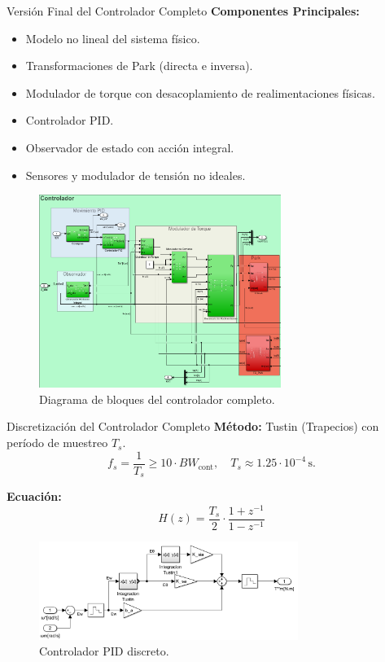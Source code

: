\documentclass[12pt]{beamer}
\begin{document}
\begin{frame}{Versión Final del Controlador Completo}
\textbf{Componentes Principales:}
\begin{itemize}
    \item Modelo no lineal del sistema físico.
    \item Transformaciones de Park (directa e inversa).
    \item Modulador de torque con desacoplamiento de realimentaciones físicas.
    \item Controlador PID.
    \item Observador de estado con acción integral.
    \item Sensores y modulador de tensión no ideales.
\end{itemize}

\begin{figure}[h]
    \centering
    \includegraphics[width=0.7\textwidth]{Imagenes/Controlador_Final.png}
    \caption{Diagrama de bloques del controlador completo.}
    \label{fig:Controlador_Final}
\end{figure}
\end{frame}

\begin{frame}{Discretización del Controlador Completo}
\textbf{Método:} Tustin (Trapecios) con período de muestreo \( T_s \).
\[
f_s = \frac{1}{T_s} \geq 10 \cdot BW_\text{cont}, \quad T_s \approx 1.25 \cdot 10^{-4} \, \text{s}.
\]

\textbf{Ecuación:}
\[
H(z) = \frac{T_s}{2} \cdot \frac{1+z^{-1}}{1-z^{-1}}
\]

\begin{figure}[h]
    \centering
    \includegraphics[width=0.75\textwidth]{Imagenes/Controlador_PID_discreto.png}
    \caption{Controlador PID discreto.}
    \label{fig:Controlador_PID_discreto}
\end{figure}
\end{frame}
\end{document}
